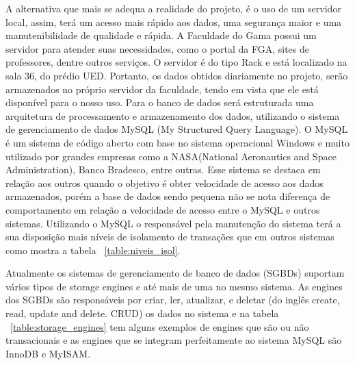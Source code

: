 A alternativa que mais se adequa a realidade do projeto, é o uso de um servidor local, assim, terá um acesso mais rápido aos dados, uma segurança maior e uma manutenibilidade de qualidade e rápida.
A Faculdade do Gama possui um servidor para atender suas necessidades, como o portal da FGA, sites de professores, dentre outros serviços. O servidor é do tipo Rack e está localizado na sala 36, do prédio UED. Portanto, os dados obtidos diariamente no projeto, serão armazenados no próprio servidor da faculdade, tendo em vista que ele está disponível para o nosso uso.
Para o banco de dados será estruturada uma arquitetura de processamento e armazenamento dos dados, utilizando o sistema de gerenciamento de dados MySQL (My Structured Query Language). O MySQL é um sistema de código aberto com base no sistema operacional Windows e muito utilizado por grandes empresas como a NASA(National Aeronautics and Space Administration), Banco Bradesco, entre outras. Esse sistema se destaca em relação aos outros quando o objetivo é obter velocidade de acesso aos dados armazenados, porém a base de dados sendo pequena não se nota diferença de comportamento em relação a velocidade de acesso entre o MySQL e outros sistemas. Utilizando o MySQL o responsável pela manutenção do sistema terá a sua disposição mais níveis de isolamento de transações que em outros sistemas como mostra a tabela ~\ref{table:niveis_isol}.

\begin{table}[]
\centering
\caption{Comparação Níveis de Isolamento.}
\label{table:niveis_isol}
\end{table}

Atualmente os sistemas de gerenciamento de banco de dados (SGBDs) suportam vários tipos de storage engines e até mais de uma no mesmo sistema. As engines dos SGBDs são responsáveis por criar, ler, atualizar,  e deletar (do inglês create, read, update and delete. CRUD) os dados no sistema e na tabela ~\ref{table:storage_engines} tem alguns exemplos de engines que são ou não transacionais e as engines que se integram perfeitamente ao sistema MySQL são InnoDB e MyISAM.


